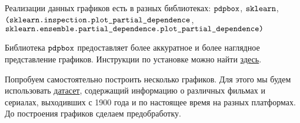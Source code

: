 Реализации данных графиков есть в разных библиотеках: $\verb|pdpbox|$, $\verb|sklearn|$,\\ $\verb|(sklearn.inspection.plot_partial_dependence|$,\\ $\verb|sklearn.ensemble.partial_dependence.plot_partial_dependence)|$

Библиотека $\verb|pdpbox|$ предоставляет более аккуратное и более наглядное представление графиков. Инструкции по установке можно найти \href{https://github.com/SauceCat/PDPbox}{здесь}.

Попробуем самостоятельно построить несколько графиков. Для этого мы будем использовать \href{https://www.kaggle.com/ruchi798/movies-on-netflix-prime-video-hulu-and-disney}{датасет}, содержащий информацию о различных фильмах и сериалах, выходивших с 1900 года и по настоящее время на разных платформах. До построения графиков сделаем предобработку.

